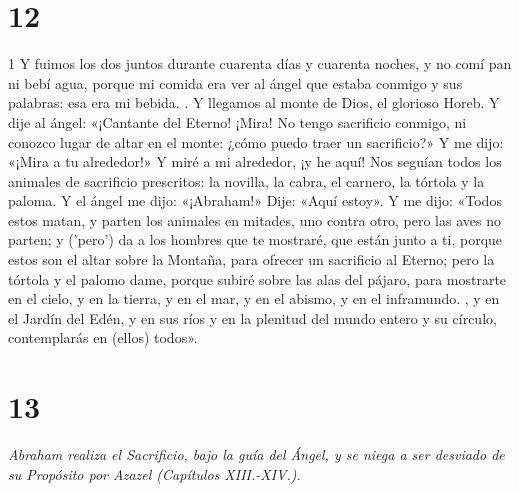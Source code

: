 \chapter{12}

\par 1 Y fuimos los dos juntos durante cuarenta días y cuarenta noches, y no comí pan ni bebí agua, porque mi comida era ver al ángel que estaba conmigo y sus palabras: esa era mi bebida. . Y llegamos al monte de Dios, el glorioso Horeb. Y dije al ángel: «¡Cantante del Eterno! ¡Mira! No tengo sacrificio conmigo, ni conozco lugar de altar en el monte: ¿cómo puedo traer un sacrificio?» Y me dijo: «¡Mira a tu alrededor!» Y miré a mi alrededor, ¡y he aquí! Nos seguían todos los animales de sacrificio prescritos: la novilla, la cabra, el carnero, la tórtola y la paloma. Y el ángel me dijo: «¡Abraham!» Dije: «Aquí estoy». Y me dijo: «Todos estos matan, y parten los animales en mitades, uno contra otro, pero las aves no parten; y ('pero') da a los hombres que te mostraré, que están junto a ti, porque estos son el altar sobre la Montaña, para ofrecer un sacrificio al Eterno; pero la tórtola y el palomo dame, porque subiré sobre las alas del pájaro, para mostrarte en el cielo, y en la tierra, y en el mar, y en el abismo, y en el inframundo. , y en el Jardín del Edén, y en sus ríos y en la plenitud del mundo entero y su círculo, contemplarás en (ellos) todos».

\chapter{13}

\par \textit{Abraham realiza el Sacrificio, bajo la guía del Ángel, y se niega a ser desviado de su Propósito por Azazel (Capítulos XIII.-XIV.).}

